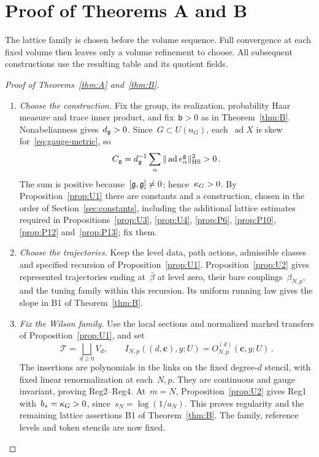 \section{Proof of Theorems A and B}\label{sec:deduction}

The lattice family is chosen before the volume sequence. Full convergence at each fixed volume then leaves only a volume refinement to choose. All subsequent constructions use the resulting table and its quotient fields.

\begin{proof}[Proof of Theorems~\ref{thm:A} and~\ref{thm:B}]\leavevmode
\begin{enumerate}[label=\emph{Step \arabic*:},ref=\arabic*,leftmargin=4.5em,itemsep=0.4em,beginpenalty=10000]
\item\label{step:deduction-choice} \emph{Choose the construction.} Fix the group, its realization, probability Haar measure and trace inner product, and fix~$\mathsf b>0$ as in Theorem~\ref{thm:B}. Nonabelianness gives~$d_{\mathfrak{g}}>0$. Since~$G\subset U(n_G)$, each~$\operatorname{ad}X$ is skew for~\eqref{eq:gauge-metric}, so
\begin{equation}\label{eq:deduction-casimir}
C_{\mathfrak{g}}=d_{\mathfrak{g}}^{-1}\sum_\alpha\|\operatorname{ad}e_\alpha^{\mathfrak{g}}\|_{\rm HS}^2>0\,.
\end{equation}
The sum is positive because~$[\mathfrak{g},\mathfrak{g}]\ne0$; hence~$\kappa_G>0$. By Proposition~\ref{prop:U1} there are constants and a construction, chosen in the order of Section~\ref{sec:constants}, including the additional lattice estimates required in Propositions~\ref{prop:U3}, \ref{prop:U4}, \ref{prop:P6}, \ref{prop:P10}, \ref{prop:P12} and~\ref{prop:P13}; fix them.

\item\label{step:deduction-trajectories} \emph{Choose the trajectories.} Keep the level data, path actions, admissible classes and specified recursion of Proposition~\ref{prop:U1}. Proposition~\ref{prop:U2} gives represented trajectories ending at~$\bar\beta$ at level zero, their bare couplings~$\beta_{N,p}$, and the tuning family within this recursion. Its uniform running law gives the slope in B1 of Theorem~\ref{thm:B}.

\item\label{step:deduction-family} \emph{Fix the Wilson family.} Use the local sections and normalized marked transfers of Proposition~\ref{prop:U1}, and set
\begin{equation}\label{eq:deduction-family}
\mathcal T=\bigsqcup_{d\ge0}V_d,\qquad I_{N,p}((d,\mathbf c),y;U)=O^{(d)}_{N,p}(\mathbf c,y;U)\,.
\end{equation}
The insertions are polynomials in the links on the fixed degree-$d$ stencil, with fixed linear renormalization at each~$N,p$. They are continuous and gauge invariant, proving Reg2--Reg4. At~$m=N$, Proposition~\ref{prop:U2} gives Reg1 with~$b_*=\kappa_G>0$, since~$s_N=\log(1/a_N)$. This proves regularity and the remaining lattice assertions B1 of Theorem~\ref{thm:B}. The family, reference levels and token stencils are now fixed.


\end{enumerate}
\end{proof}
